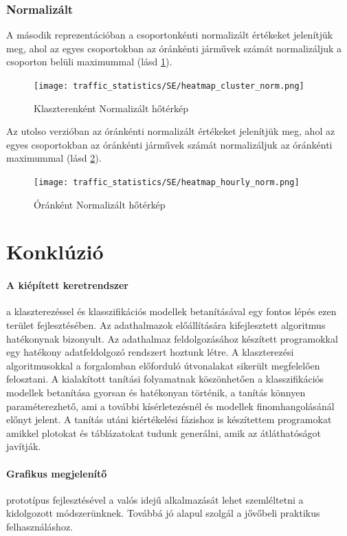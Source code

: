 \documentclass[12pt,a4paper]{article}
\begin{document}
\subsubsection*{Normalizált}
A második reprezentációban a csoportonkénti normalizált értékeket jelenítjük meg, ahol az egyes csoportokban az óránkénti járművek számát normalizáljuk a csoporton belüli maximummal (lásd \ref{fig:heatmapnorm_cluster}).
\begin{figure}[H]
    \centering
    \texttt{[image: traffic\_statistics/SE/heatmap\_cluster\_norm.png]}
    \caption{Klaszterenként Normalizált hőtérkép}
    \label{fig:heatmapnorm_cluster}
\end{figure}
Az utolso verzióban az óránkénti normalizált értékeket jelenítjük meg, ahol az egyes csoportokban az óránkénti járművek számát normalizáljuk az óránkénti maximummal (lásd \ref{fig:heatmapnorm_hourly}).
\begin{figure}[H]
    \centering
    \texttt{[image: traffic\_statistics/SE/heatmap\_hourly\_norm.png]}
    \caption{Óránként Normalizált hőtérkép}
    \label{fig:heatmapnorm_hourly}
\end{figure}

\newpage
\section{Konklúzió}
\paragraph{A kiépített keretrendszer} a klaszterezéssel és klasszifikációs modellek betanításával egy fontos lépés ezen terület fejlesztésében.
Az adathalmazok előállítására kifejlesztett algoritmus hatékonynak bizonyult. Az adathalmaz feldolgozásához készített programokkal egy hatékony
adatfeldolgozó rendszert hoztunk létre. A klaszterezési algoritmusokkal a forgalomban előforduló útvonalakat sikerült megfelelően felosztani.
A kialakított tanítási folyamatnak köszönhetően a klasszifikációs modellek betanítása gyorsan és hatékonyan történik, a tanítás könnyen paraméterezhető, ami a további kísérletezésnél és modellek finomhangolásánál előnyt jelent.
A tanítás utáni kiértékelési fázishoz is készítettem programokat amikkel plotokat és táblázatokat tudunk generálni, amik az átláthatóságot javítják.
\paragraph{Grafikus megjelenítő} prototípus fejlesztésével a valós idejű alkalmazását lehet szemléltetni a kidolgozott módszerünknek. Továbbá jó alapul szolgál a jővőbeli praktikus felhasználáshoz.
\end{document}
